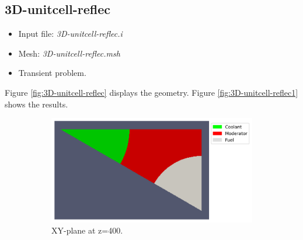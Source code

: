 \documentclass[11pt,letterpaper]{article}
\begin{document}
\subsection{3D-unitcell-reflec}

	\begin{itemize}
		\item Input file: \textit{3D-unitcell-reflec.i}
		\item Mesh: \textit{3D-unitcell-reflec.msh}
		\item Transient problem.
	\end{itemize}

Figure \ref{fig:3D-unitcell-reflec} displays the geometry.
Figure \ref{fig:3D-unitcell-reflec1} shows the results.

	\begin{figure}[htbp!]
		\centering
		\begin{subfigure}[t]{0.4\textwidth}
			\centering
			\includegraphics[width=\linewidth]{3D-unitcell-mesh1}
			\caption{XY-plane at z=400.}
		\end{subfigure}
		\begin{subfigure}[t]{0.4\textwidth}
			\centering

\end{subfigure}
\end{figure}
\end{document}
